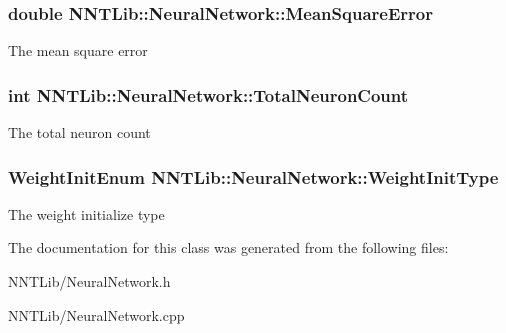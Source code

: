 \subsubsection[{Mean\+Square\+Error}]{\setlength{\rightskip}{0pt plus 5cm}double N\+N\+T\+Lib\+::\+Neural\+Network\+::\+Mean\+Square\+Error}\label{class_n_n_t_lib_1_1_neural_network_aa81b59c0bab012cc65f37cfc8870fb7c}


The mean square error 

\hypertarget{class_n_n_t_lib_1_1_neural_network_aeb06dfbd4762d8ce321f7e21532bdad7}{}
\subsubsection[{Total\+Neuron\+Count}]{\setlength{\rightskip}{0pt plus 5cm}int N\+N\+T\+Lib\+::\+Neural\+Network\+::\+Total\+Neuron\+Count}\label{class_n_n_t_lib_1_1_neural_network_aeb06dfbd4762d8ce321f7e21532bdad7}


The total neuron count 

\hypertarget{class_n_n_t_lib_1_1_neural_network_aef757cbe4d01525f99125716f217135d}{}
\subsubsection[{Weight\+Init\+Type}]{\setlength{\rightskip}{0pt plus 5cm}Weight\+Init\+Enum N\+N\+T\+Lib\+::\+Neural\+Network\+::\+Weight\+Init\+Type}\label{class_n_n_t_lib_1_1_neural_network_aef757cbe4d01525f99125716f217135d}


The weight initialize type 



The documentation for this class was generated from the following files\+:\begin{DoxyCompactItemize}
\item 
N\+N\+T\+Lib/Neural\+Network.\+h\item 
N\+N\+T\+Lib/Neural\+Network.\+cpp\end{DoxyCompactItemize}
